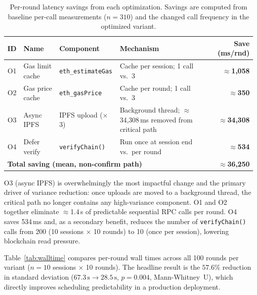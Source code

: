 \documentclass{llncs}
\begin{document}
\begin{table}[t]
\caption{Per-round latency savings from each optimization.
  Savings are computed from baseline per-call measurements
  ($n=310$) and the changed call frequency in the optimized variant.}
\label{tab:opts}
\centering\footnotesize
\setlength{\tabcolsep}{4pt}
\begin{tabular}{cllp{3.4cm}r}
\toprule
\textbf{ID} & \textbf{Name} & \textbf{Component} & \textbf{Mechanism}
  & \textbf{Save (ms/rnd)} \\
\midrule
O1 & Gas limit cache  & \texttt{eth\_estimateGas}
   & Cache per session; 1 call vs.\ 3
   & $\approx$\textbf{1{,}058} \\
O2 & Gas price cache  & \texttt{eth\_gasPrice}
   & Cache per round; 1 call vs.\ 3
   & $\approx$\textbf{350} \\
O3 & Async IPFS       & IPFS upload ($\times$3)
   & Background thread; $\approx$34{,}308\,ms removed from critical path
   & $\approx$\textbf{34{,}308} \\
O4 & Defer verify     & \texttt{verifyChain()}
   & Run once at session end vs.\ per round
   & $\approx$\textbf{534} \\
\midrule
\multicolumn{4}{l}{\textbf{Total saving (mean, non-confirm path)}}
  & $\approx$\textbf{36{,}250} \\
\bottomrule
\end{tabular}
\end{table}

O3 (async IPFS) is overwhelmingly the most impactful change and the primary
driver of variance reduction: once uploads are moved to a background thread,
the critical path no longer contains any high-variance component. O1 and O2
together eliminate $\approx$1.4\,s of predictable sequential RPC calls per
round. O4 saves 534\,ms and, as a secondary benefit, reduces the number of
\texttt{verifyChain()} calls from 200 (10 sessions $\times$ 10 rounds) to
10 (once per session), lowering blockchain read pressure.

Table~\ref{tab:walltime} compares per-round wall times across all
100 rounds per variant ($n=10$ sessions $\times$ 10 rounds). The headline
result is the $57.6\%$ reduction in standard deviation
($67.3\,\text{s}\rightarrow28.5\,\text{s}$, $p{=}0.004$, Mann-Whitney~U),
which directly improves scheduling predictability in a production deployment.
\end{document}
